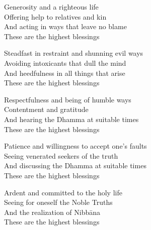 \begin{english-only}
  Generosity and a righteous life\\
  Offering help to relatives and kin\\
  And acting in ways that leave no blame\\
  These are the highest blessings
\end{english-only}

\begin{english-only}
  Steadfast in restraint and shunning evil ways\\
  Avoiding intoxicants that dull the mind\\
  And heedfulness in all things that arise\\
  These are the highest blessings
\end{english-only}

\begin{english-only}
  Respectfulness and being of humble ways\\
  Contentment and gratitude\\
  And hearing the Dhamma at suitable times\ifdigitalversion\makeatletter\hyperlink{endnote151-appendix}\fi\\
  These are the highest blessings
\end{english-only}

\begin{english-only}
  Patience and willingness to accept one's faults\\
  Seeing venerated seekers of the truth\\
  And discussing the Dhamma at suitable times\ifdigitalversion\makeatletter\hyperlink{endnote151-appendix}\fi\\
  These are the highest blessings
\end{english-only}

\begin{english-only}
  Ardent and committed\ifdigitalversion\makeatletter\hyperlink{endnote48-appendix}\makeatother \thinspace\fi
  to the holy life\\
  Seeing for oneself the Noble Truths\\
  And the realization of Nibbāna\\
  These are the highest blessings
\end{english-only}

